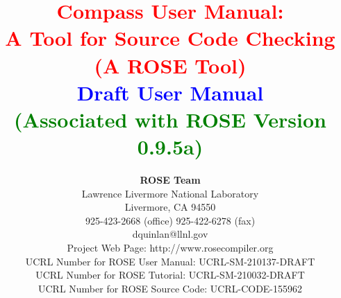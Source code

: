 \documentclass[10pt]{book}
\begin{document}
%
%


\title{ {\bf \textcolor{red}{         Compass User Manual: \\ 
                                A Tool for Source Code Checking \\
                                        (A ROSE Tool)} \\
                               \textcolor{blue}{Draft User Manual} \\
                               \textcolor{green}{(Associated with ROSE Version 0.9.5a)} } }

\author{ {\bf ROSE Team} \\
         Lawrence Livermore National Laboratory \\ 
         Livermore, CA  94550 \\
         925-423-2668 (office)  925-422-6278 (fax) \\
         {dquinlan}@llnl.gov \\
         Project Web Page: http://www.rosecompiler.org \\
         UCRL Number for ROSE User Manual: UCRL-SM-210137-DRAFT \\
         UCRL Number for ROSE Tutorial: UCRL-SM-210032-DRAFT \\
         UCRL Number for ROSE Source Code: UCRL-CODE-155962 \\ \\
          \\
          \\
       }

\end{document}
